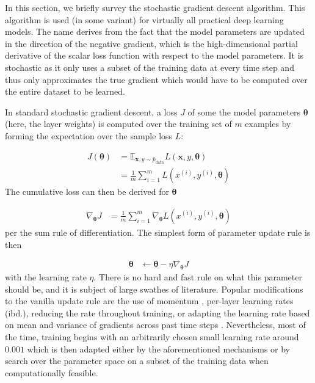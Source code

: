 In this section, we briefly survey the stochastic gradient descent algorithm.
This algorithm is used (in some variant) for virtually all practical deep
learning models. The name derives from the fact that the model parameters are
updated in the direction of the negative gradient, which is the high-dimensional
partial derivative of the scalar loss function with respect to the model parameters. It
is stochastic as it only uses a subset of the training data at every time step
and thus only approximates the true gradient which would have to be computed
over the entire dataset to be learned.

In standard stochastic gradient descent, a loss $J$ of some the
model parameters $\boldsymbol\theta$ (here, the layer weights) is computed over the training set of $m$
examples by forming the expectation over the sample loss $L$:

\begin{align}
    J(\boldsymbol\theta) &= \mathbb{E}_{\mathbf{x},y\sim\hat{p}_{\text{data}}} L(\mathbf{x}, y, \boldsymbol\theta) \\
                         &= \frac{1}{m}\sum_{i=1}^{m}L(x^{(i)}, y^{(i)}, \boldsymbol\theta)
\end{align}
The cumulative loss can then be derived for $\boldsymbol\theta$

\begin{align}
    \nabla_{\boldsymbol\theta}J &= \frac{1}{m}\sum_{i=1}^{m}\nabla_{\boldsymbol\theta}L(x^{(i)}, y^{(i)}, \boldsymbol\theta)
\end{align}
per the sum rule of differentiation. The simplest form of parameter update rule
is then

\begin{align}
    \boldsymbol\theta &\leftarrow \boldsymbol\theta - \eta \nabla_{\boldsymbol\theta}J
\end{align}
with the learning rate $\eta$. There is no hard and fast rule on what this
parameter should be, and it is subject of large swathes of literature. Popular
modifications to the vanilla update rule are the use of momentum
\citep{jacobs1988increased}, per-layer learning rates (ibd.), reducing the rate
throughout training, or adapting the
learning rate based on mean and variance of gradients across past time steps
\citep{kingma2014adam}. Nevertheless, most of the time, training begins with an
arbitrarily chosen small learning rate around $0.001$ which is then adapted
either by the aforementioned mechanisms or by search over the parameter space on
a subset of the training data when computationally feasible.

